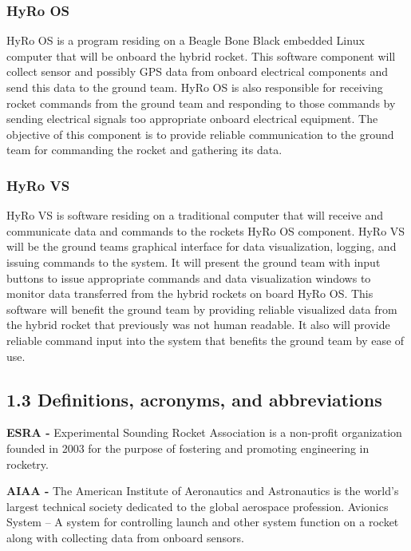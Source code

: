 \documentclass[10pt,draftclsnofoot,onecolumn,compsoc]{IEEEtran}
\begin{document}
\subsubsection{HyRo OS}
 HyRo OS is a program residing on a Beagle Bone Black embedded Linux computer that will be onboard the hybrid rocket. This software component will collect sensor and possibly
 GPS data from onboard electrical components and send this data to the ground team. HyRo OS is also responsible for receiving rocket commands from the ground team and responding to those
 commands by sending electrical signals too appropriate onboard electrical equipment. The objective of this component is to provide reliable communication to the ground team for commanding
 the rocket and gathering its data. 
\subsubsection{HyRo VS}
HyRo VS is software residing on a traditional computer that will receive and communicate data and commands to the rockets HyRo OS component. HyRo VS will be the ground
 teams graphical interface for data visualization, logging, and issuing commands to the system. It will present the ground team with input buttons to issue appropriate commands and data
 visualization windows to monitor data transferred from the hybrid rockets on board HyRo OS. This software will benefit the ground team by providing reliable visualized data from the 
 hybrid rocket that previously was not human readable. It also will provide reliable command input into the system that benefits the ground team by ease of use.
\subsection{1.3  Definitions, acronyms, and abbreviations}
{\bf ESRA -}  Experimental Sounding Rocket Association is a non-profit organization founded in 2003 for the purpose of fostering and promoting engineering in rocketry. \par

{\bf AIAA -} The American Institute of Aeronautics and Astronautics is the world's largest technical society dedicated to the global aerospace profession.
Avionics System –  A system for controlling launch and other system function on a rocket along with collecting data from onboard sensors.\par
\end{document}
